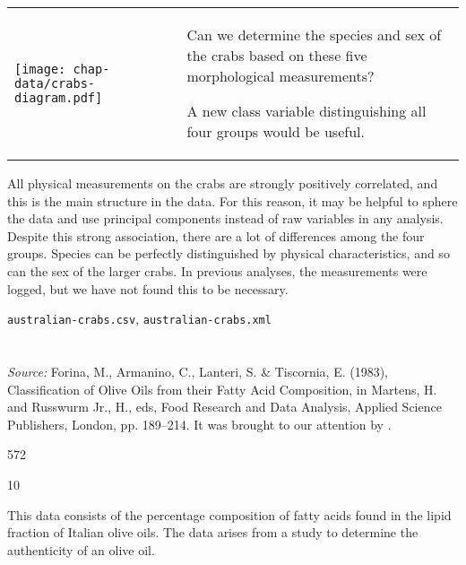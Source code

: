 \begin{tabular}{p{2in}p{0.2in}p{2in}}
{\texttt{[image: chap-data/crabs-diagram.pdf]}}
& &
\vspace{-1.5in}
\noindent{\em Primary question:} Can we determine the species and sex
of the crabs based on these five morphological measurements?

\bigskip
\noindent{\em Data restructuring:} A new class variable distinguishing 
all four groups would be useful.
\end{tabular}

\bigskip
{} All physical measurements on the crabs
are strongly positively correlated, and this is the main structure in
the data. For this reason, it may be helpful to sphere the data and
use principal components instead of raw variables in any
analysis. Despite this strong association, there are a lot of
differences among the four groups.  Species can be perfectly
distinguished by physical characteristics, and so can the sex of the
larger crabs. In previous analyses, the measurements were logged, but
we have not found this to be necessary.

\bigskip
{}

\smallskip

{\tt australian-crabs.csv}, {\tt australian-crabs.xml}

\section{}

{\em Source:} Forina, M., Armanino, C., Lanteri, S. \& Tiscornia,
E. (1983), Classification of Olive Oils from their Fatty Acid
Composition, in Martens, H. and Russwurm Jr., H., eds, Food Research
and Data Analysis, Applied Science Publishers, London, pp. 189--214.
\nocite{FALT83} It was brought to our attention by .

\bigskip
{} 572

 10

\smallskip
{} This data consists of the percentage
composition of fatty acids found in the lipid fraction of Italian
olive oils.  The data arises from a study to determine the
authenticity of an olive oil.

